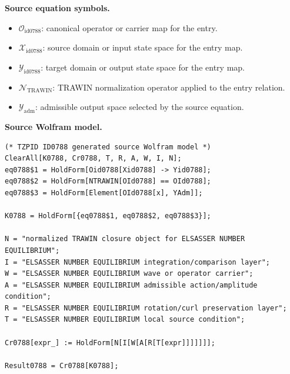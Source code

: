\begin{minipage}[t]{0.49\linewidth}
\begingroup
\small
\raggedright
\textbf{Source equation symbols.}\par
\begin{itemize}[leftmargin=1.35em,itemsep=1pt,topsep=1pt,parsep=0pt]
    \item $\mathcal{O}_{\mathrm{id0788}}$: canonical operator or carrier map for the entry.
    \item $\mathcal{X}_{\mathrm{id0788}}$: source domain or input state space for the entry map.
    \item $\mathcal{Y}_{\mathrm{id0788}}$: target domain or output state space for the entry map.
    \item $\mathcal{N}_{\mathrm{TRAWIN}}$: TRAWIN normalization operator applied to the entry relation.
    \item $\mathcal{Y}_{\mathrm{adm}}$: admissible output space selected by the source equation.
\end{itemize}
\endgroup
\end{minipage}\hfill
\begin{minipage}[t]{0.47\linewidth}
\begingroup
\scriptsize
\raggedright
\textbf{Source Wolfram model.}\par
\begin{Verbatim}[fontsize=\tiny,breaklines=true,breakanywhere=true]
(* TZPID ID0788 generated source Wolfram model *)
ClearAll[K0788, Cr0788, T, R, A, W, I, N];
eq0788$1 = HoldForm[Oid0788[Xid0788] -> Yid0788];
eq0788$2 = HoldForm[NTRAWIN[OId0788] == OId0788];
eq0788$3 = HoldForm[Element[OId0788[x], YAdm]];

K0788 = HoldForm[{eq0788$1, eq0788$2, eq0788$3}];

N = "normalized TRAWIN closure object for ELSASSER NUMBER EQUILIBRIUM";
I = "ELSASSER NUMBER EQUILIBRIUM integration/comparison layer";
W = "ELSASSER NUMBER EQUILIBRIUM wave or operator carrier";
A = "ELSASSER NUMBER EQUILIBRIUM admissible action/amplitude condition";
R = "ELSASSER NUMBER EQUILIBRIUM rotation/curl preservation layer";
T = "ELSASSER NUMBER EQUILIBRIUM local source condition";

Cr0788[expr_] := HoldForm[N[I[W[A[R[T[expr]]]]]]];

Result0788 = Cr0788[K0788];
\end{Verbatim}
\endgroup
\end{minipage}

